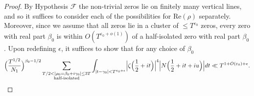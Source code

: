 \documentclass[12pt]{amsart}
\theoremstyle{plain}
\theoremstyle{definition}
\theoremstyle{remark}
\begin{document}
 \begin{proof}
By Hypothesis $\mathcal{F}$ the non-trivial zeros lie on finitely many vertical lines, and so it suffices to consider each of the possibilities for $\text{Re}(\rho)$ separately. Moreover, since we assume that all zeros lie in a cluster of $\leq T^{\varepsilon_0}$ zeros, every zero with real part $\beta_0$ is within $O(T^{\varepsilon_0+o(1)})$ of a half-isolated zero with real part $\beta_0$. Upon redefining $\epsilon$, it suffices to show that for any choice of $\beta_0$
\[
\Bigl(\frac{T^{1/2}}{N_1}\Bigr)^{\beta_0-1/2}\sum_{\substack{T/2<|\rho_0=\beta_0+i\gamma_0|\leq 3T\\ \text{half-isolated} }}\int_{|t-\gamma_0|<T^{\varepsilon_0 + \epsilon}} \Bigl| \zeta \Bigl(\frac{1}{2}+it \Bigr) \Bigr|^{4}\Bigl|N\Bigl(\frac{1}{2}+it+iu\Bigr)\Bigr| dt\ll T^{1+O(\varepsilon_0)+\epsilon}.
\]


\end{proof}
\end{document}
